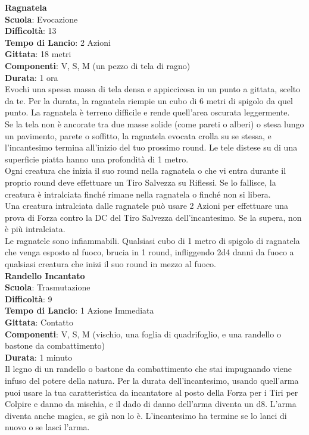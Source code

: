 \begin{multicols}{2}
\medskip\textbf{Ragnatela}\\
\textbf{Scuola}: Evocazione\\
\textbf{Difficoltà}: 13\\
\textbf{Tempo di Lancio}: 2 Azioni\\
\textbf{Gittata}: 18 metri\\
\textbf{Componenti}: V, S, M (un pezzo di tela di ragno)\\
\textbf{Durata}: 1 ora\\
Evochi una spessa massa di tela densa e appiccicosa in un punto a gittata, scelto da te. Per la durata, la ragnatela riempie un cubo di 6 metri di spigolo da quel punto. La ragnatela è terreno difficile e rende quell'area oscurata leggermente.\\
Se la tela non è ancorate tra due masse solide (come pareti o alberi) o stesa lungo un pavimento, parete o soffitto, la ragnatela evocata crolla su se stessa, e l'incantesimo termina all'inizio del tuo prossimo round. Le tele distese su di una superficie piatta hanno una profondità di 1 metro.\\
Ogni creatura che inizia il suo round nella ragnatela o che vi entra durante il proprio round deve effettuare un Tiro Salvezza su Riflessi. Se lo fallisce, la creatura è intralciata finché rimane nella ragnatela o finché non si libera.\\
Una creatura intralciata dalle ragnatele può usare 2 Azioni per effettuare una prova di Forza contro la DC del Tiro Salvezza dell'incantesimo. Se la supera, non è più intralciata.\\
Le ragnatele sono infiammabili. Qualsiasi cubo di 1 metro di spigolo di ragnatela che venga esposto al fuoco, brucia in 1 round, infliggendo 2d4 danni da fuoco a qualsiasi creatura che inizi il suo round in mezzo al fuoco.\\

\medskip\textbf{Randello Incantato}\\
\textbf{Scuola}: Trasmutazione\\
\textbf{Difficoltà}: 9\\
\textbf{Tempo di Lancio}: 1 Azione Immediata\\
\textbf{Gittata}: Contatto\\
\textbf{Componenti}: V, S, M (vischio, una foglia di quadrifoglio, e una randello o bastone da combattimento)\\
\textbf{Durata}: 1 minuto\\
Il legno di un randello o bastone da combattimento che stai impugnando viene infuso del potere della natura. Per la durata dell'incantesimo, usando quell'arma puoi usare la tua caratteristica da incantatore al posto della Forza per i Tiri per Colpire e danno da mischia, e il dado di danno dell'arma diventa un d8. L'arma diventa anche magica, se già non lo è. L'incantesimo ha termine se lo lanci di nuovo o se lasci l'arma.


\end{multicols}

